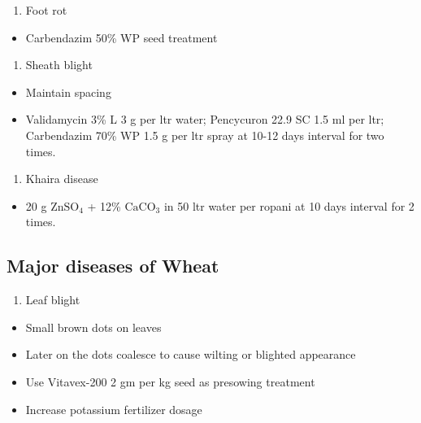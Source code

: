 \documentclass[
  openany]{book}
\providecommand{\tightlist}{%
  \setlength{\itemsep}{0pt}\setlength{\parskip}{0pt}}
\begin{document}
\begin{enumerate}
\def\labelenumi{\arabic{enumi}.}
\setcounter{enumi}{3}
\tightlist
\item
  Foot rot
\end{enumerate}

\begin{itemize}
\tightlist
\item
  Carbendazim 50\% WP seed treatment
\end{itemize}

\begin{enumerate}
\def\labelenumi{\arabic{enumi}.}
\setcounter{enumi}{4}
\tightlist
\item
  Sheath blight
\end{enumerate}

\begin{itemize}
\tightlist
\item
  Maintain spacing
\item
  Validamycin 3\% L 3 g per ltr water; Pencycuron 22.9 SC 1.5 ml per ltr; Carbendazim 70\% WP 1.5 g per ltr spray at 10-12 days interval for two times.
\end{itemize}

\begin{enumerate}
\def\labelenumi{\arabic{enumi}.}
\setcounter{enumi}{5}
\tightlist
\item
  Khaira disease
\end{enumerate}

\begin{itemize}
\tightlist
\item
  20 g \(\mathrm{ZnSO_4}\) + 12\% \(\mathrm{CaCO_3}\) in 50 ltr water per ropani at 10 days interval for 2 times.
\end{itemize}

\hypertarget{major-diseases-of-wheat}{%
\subsection{Major diseases of Wheat}\label{major-diseases-of-wheat}}

\begin{enumerate}
\def\labelenumi{\arabic{enumi}.}
\tightlist
\item
  Leaf blight
\end{enumerate}

\begin{itemize}
\tightlist
\item
  Small brown dots on leaves
\item
  Later on the dots coalesce to cause wilting or blighted appearance
\item
  Use Vitavex-200 2 gm per kg seed as presowing treatment
\item
  Increase potassium fertilizer dosage
\end{itemize}
\end{document}
